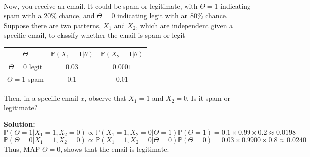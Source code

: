 \begin{eg}~

  Now, you receive an email. It could be spam or legitimate, with \(\Theta = 1\) indicating spam with a 20\% chance, and \(\Theta = 0\) indicating legit with an 80\% chance. Suppose there are two patterns, \(X_1\) and \(X_2\), which are independent given a specific email, to classify whether the email is spam or legit.

  \begin{table}[H]
    \centering
    \begin{tabular}{c|c|c}
        \toprule
        \(\Theta\) & \(\mathbb{P}(X_1 = 1 \vert \theta)\) & \(\mathbb{P}(X_2 = 1 \vert \theta)\)  \\
      \midrule
        \(\Theta = 0\) legit & \(0.03\) & \(0.0001\)  \\
        \(\Theta = 1\) spam & \(0.1\) & \(0.01\)  \\
        \bottomrule
    \end{tabular}
  \end{table}
  Then, in a specific email \(x\), observe that \(X_1 = 1\) and \(X_2 = 0\). Is it spam or legitimate?

  \textbf{Solution:} 
  \[
    \mathbb{P}(\Theta = 1 \vert X_1 = 1, X_2 = 0) \propto \mathbb{P}(X_1 = 1, X_2 = 0 \vert \Theta = 1)\mathbb{P}(\Theta = 1) = 0.1 \times 0.99 \times 0.2 \approx 0.0198
  \]
  \[
    \mathbb{P}(\Theta = 0 \vert X_1 = 1, X_2 = 0) \propto \mathbb{P}(X_1 = 1, X_2 = 0 \vert \Theta = 0)\mathbb{P}(\Theta = 0) = 0.03 \times 0.9900 \times 0.8 \approx 0.0240
  \]
  Thus, MAP \(\Theta = 0\), shows that the email is legitimate. 
\end{eg}

